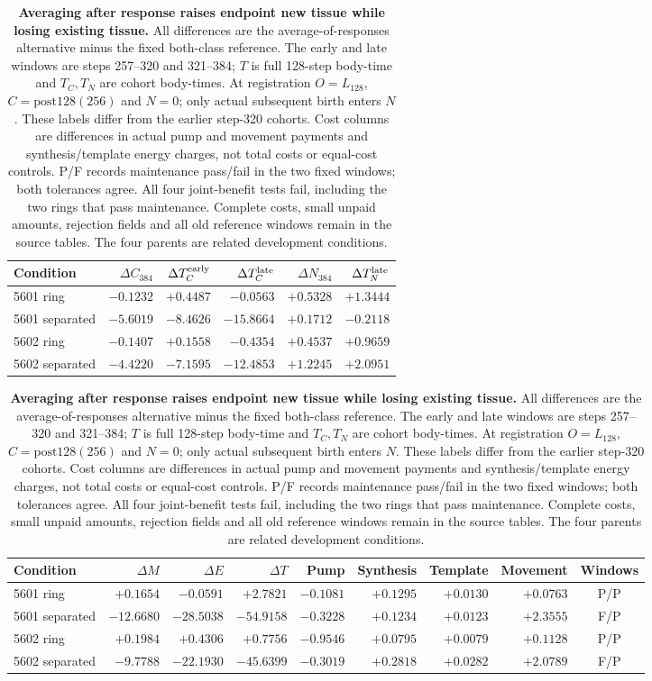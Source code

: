 \begin{table}[!htbp]
\centering
\footnotesize
\setlength{\tabcolsep}{3pt}
\begin{tabular}{lrrrrr}
\toprule
Condition & $\Delta C_{384}$ & $\Delta T_C^{\rm early}$ & $\Delta T_C^{\rm late}$ & $\Delta N_{384}$ & $\Delta T_N^{\rm late}$ \\
\midrule
5601 ring & $-0.1232$ & $+0.4487$ & $-0.0563$ & $+0.5328$ & $+1.3444$ \\
5601 separated & $-5.6019$ & $-8.4626$ & $-15.8664$ & $+0.1712$ & $-0.2118$ \\
5602 ring & $-0.1407$ & $+0.1558$ & $-0.4354$ & $+0.4537$ & $+0.9659$ \\
5602 separated & $-4.4220$ & $-7.1595$ & $-12.4853$ & $+1.2245$ & $+2.0951$ \\
\bottomrule
\end{tabular}
\par\medskip
\begin{tabular}{lrrrrrrrc}
\toprule
Condition & $\Delta M$ & $\Delta E$ & $\Delta T$ & Pump & Synthesis & Template & Movement & Windows \\
\midrule
5601 ring & $+0.1654$ & $-0.0591$ & $+2.7821$ & $-0.1081$ & $+0.1295$ & $+0.0130$ & $+0.0763$ & P/P \\
5601 separated & $-12.6680$ & $-28.5038$ & $-54.9158$ & $-0.3228$ & $+0.1234$ & $+0.0123$ & $+2.3555$ & F/P \\
5602 ring & $+0.1984$ & $+0.4306$ & $+0.7756$ & $-0.9546$ & $+0.0795$ & $+0.0079$ & $+0.1128$ & P/P \\
5602 separated & $-9.7788$ & $-22.1930$ & $-45.6399$ & $-0.3019$ & $+0.2818$ & $+0.0282$ & $+2.0789$ & F/P \\
\bottomrule
\end{tabular}
\caption{\textbf{Averaging after response raises endpoint new tissue while losing existing tissue.} All differences are the average-of-responses alternative minus the fixed both-class reference. The early and late windows are steps 257--320 and 321--384; $T$ is full 128-step body-time and $T_C,T_N$ are cohort body-times. At registration $O=L_{128}$, $C=\mathrm{post128}(256)$ and $N=0$; only actual subsequent birth enters $N$. These labels differ from the earlier step-320 cohorts. Cost columns are differences in actual pump and movement payments and synthesis/template energy charges, not total costs or equal-cost controls. P/F records maintenance pass/fail in the two fixed windows; both tolerances agree. All four joint-benefit tests fail, including the two rings that pass maintenance. Complete costs, small unpaid amounts, rejection fields and all old reference windows remain in the source tables. The four parents are related development conditions.}
\label{tab:response-pooling}
\end{table}
